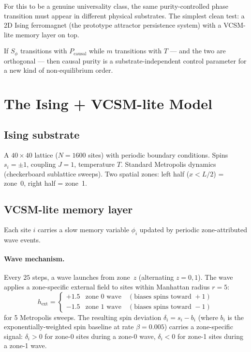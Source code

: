 \documentclass[11pt,a4paper]{article}
\begin{document}
For this to be a genuine universality class,
the same purity-controlled phase transition must appear in different
physical substrates.
The simplest clean test: a 2D Ising ferromagnet (the prototype attractor
persistence system) with a VCSM-lite memory layer on top.

If $S_\phi$ transitions with $P_\mathrm{causal}$ while $m$ transitions with $T$
--- and the two are orthogonal --- then causal purity is a substrate-independent
control parameter for a new kind of non-equilibrium order.

\section{The Ising + VCSM-lite Model}

\subsection{Ising substrate}

A $40 \times 40$ lattice ($N=1600$ sites) with periodic boundary conditions.
Spins $s_i = \pm 1$, coupling $J=1$, temperature $T$.
Standard Metropolis dynamics (checkerboard sublattice sweeps).
Two spatial zones: left half ($x < L/2$) = zone~0, right half = zone~1.

\subsection{VCSM-lite memory layer}

Each site $i$ carries a slow memory variable $\phi_i$ updated by periodic
zone-attributed wave events.

\paragraph{Wave mechanism.}
Every $25$ steps, a wave launches from zone~$z$ (alternating $z=0,1$).
The wave applies a zone-specific external field to sites within Manhattan
radius $r=5$:
\begin{equation}
  h_\mathrm{ext} = \begin{cases}
    +1.5 & \text{zone 0 wave} \quad (\text{biases spins toward } +1) \\
    -1.5 & \text{zone 1 wave} \quad (\text{biases spins toward } -1)
  \end{cases}
\end{equation}
for 5 Metropolis sweeps.
The resulting spin deviation $\delta_i = s_i - b_i$ (where $b_i$ is the
exponentially-weighted spin baseline at rate $\beta=0.005$) carries a
zone-specific signal: $\delta_i > 0$ for zone-0 sites during a zone-0 wave,
$\delta_i < 0$ for zone-1 sites during a zone-1 wave.
\end{document}
